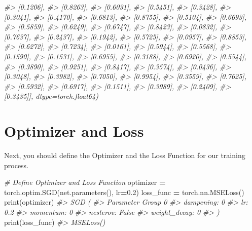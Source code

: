 \documentclass[]{book}
\newenvironment{Shaded}{\begin{snugshade}}{\end{snugshade}}
\newcommand{\BuiltInTok}[1]{#1}
\newcommand{\CommentTok}[1]{\textcolor[rgb]{0.56,0.35,0.01}{\textit{#1}}}
\newcommand{\FloatTok}[1]{\textcolor[rgb]{0.00,0.00,0.81}{#1}}
\newcommand{\NormalTok}[1]{#1}
\newcommand{\OperatorTok}[1]{\textcolor[rgb]{0.81,0.36,0.00}{\textbf{#1}}}
\begin{document}
\begin{Shaded}
\begin{Highlighting}[]
\CommentTok{#>         [0.1206],}
\CommentTok{#>         [0.8263],}
\CommentTok{#>         [0.6031],}
\CommentTok{#>         [0.5451],}
\CommentTok{#>         [0.3428],}
\CommentTok{#>         [0.3041],}
\CommentTok{#>         [0.4170],}
\CommentTok{#>         [0.6813],}
\CommentTok{#>         [0.8755],}
\CommentTok{#>         [0.5104],}
\CommentTok{#>         [0.6693],}
\CommentTok{#>         [0.5859],}
\CommentTok{#>         [0.6249],}
\CommentTok{#>         [0.6747],}
\CommentTok{#>         [0.8423],}
\CommentTok{#>         [0.0832],}
\CommentTok{#>         [0.7637],}
\CommentTok{#>         [0.2437],}
\CommentTok{#>         [0.1942],}
\CommentTok{#>         [0.5725],}
\CommentTok{#>         [0.0957],}
\CommentTok{#>         [0.8853],}
\CommentTok{#>         [0.6272],}
\CommentTok{#>         [0.7234],}
\CommentTok{#>         [0.0161],}
\CommentTok{#>         [0.5944],}
\CommentTok{#>         [0.5568],}
\CommentTok{#>         [0.1590],}
\CommentTok{#>         [0.1531],}
\CommentTok{#>         [0.6955],}
\CommentTok{#>         [0.3188],}
\CommentTok{#>         [0.6920],}
\CommentTok{#>         [0.5544],}
\CommentTok{#>         [0.3890],}
\CommentTok{#>         [0.9251],}
\CommentTok{#>         [0.8417],}
\CommentTok{#>         [0.3574],}
\CommentTok{#>         [0.0436],}
\CommentTok{#>         [0.3048],}
\CommentTok{#>         [0.3982],}
\CommentTok{#>         [0.7050],}
\CommentTok{#>         [0.9954],}
\CommentTok{#>         [0.3559],}
\CommentTok{#>         [0.7625],}
\CommentTok{#>         [0.5932],}
\CommentTok{#>         [0.6917],}
\CommentTok{#>         [0.1511],}
\CommentTok{#>         [0.3989],}
\CommentTok{#>         [0.2409],}
\CommentTok{#>         [0.3435]], dtype=torch.float64)}
\end{Highlighting}
\end{Shaded}

\hypertarget{optimizer-and-loss}{%
\section{Optimizer and Loss}\label{optimizer-and-loss}}

Next, you should define the Optimizer and the Loss Function for our training process.

\begin{Shaded}
\begin{Highlighting}[]
\CommentTok{# Define Optimizer and Loss Function}
\NormalTok{optimizer }\OperatorTok{=}\NormalTok{ torch.optim.SGD(net.parameters(), lr}\OperatorTok{=}\FloatTok{0.2}\NormalTok{)}
\NormalTok{loss_func }\OperatorTok{=}\NormalTok{ torch.nn.MSELoss()}
\BuiltInTok{print}\NormalTok{(optimizer)}
\CommentTok{#> SGD (}
\CommentTok{#> Parameter Group 0}
\CommentTok{#>     dampening: 0}
\CommentTok{#>     lr: 0.2}
\CommentTok{#>     momentum: 0}
\CommentTok{#>     nesterov: False}
\CommentTok{#>     weight_decay: 0}
\CommentTok{#> )}
\BuiltInTok{print}\NormalTok{(loss_func)}
\CommentTok{#> MSELoss()}
\end{Highlighting}
\end{Shaded}
\end{document}
